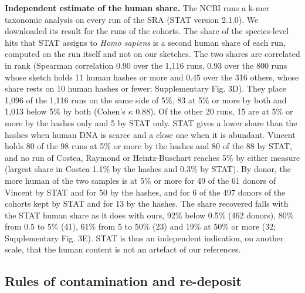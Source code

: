 \documentclass[11pt,a4paper]{article}
\begin{document}
\textbf{Independent estimate of the human share.} The NCBI runs a k-mer taxonomic analysis on every run of the SRA (STAT version 2.1.0\cite{katz2021}). We downloaded its result for the runs of the cohorts. The share of the species-level hits that STAT assigns to \textit{Homo sapiens} is a second human share of each run, computed on the run itself and not on our sketches. The two shares are correlated in rank (Spearman correlation 0.90 over the 1,116 runs, 0.93 over the 800 runs whose sketch holds 11 human hashes or more and 0.45 over the 316 others, whose share rests on 10 human hashes or fewer; Supplementary Fig. 3D). They place 1,096 of the 1,116 runs on the same side of 5\%, 83 at 5\% or more by both and 1,013 below 5\% by both (Cohen's $\kappa$ 0.88). Of the other 20 runs, 15 are at 5\% or more by the hashes only and 5 by STAT only. STAT gives a lower share than the hashes when human DNA is scarce and a close one when it is abundant. Vincent holds 80 of the 98 runs at 5\% or more by the hashes and 80 of the 88 by STAT, and no run of Costea, Raymond or Heintz-Buschart reaches 5\% by either measure (largest share in Costea 1.1\% by the hashes and 0.3\% by STAT). By donor, the more human of the two samples is at 5\% or more for 49 of the 61 donors of Vincent by STAT and for 50 by the hashes, and for 6 of the 497 donors of the cohorts kept by STAT and for 13 by the hashes. The share recovered falls with the STAT human share as it does with ours, 92\% below 0.5\% (462 donors), 80\% from 0.5 to 5\% (41), 61\% from 5 to 50\% (23) and 19\% at 50\% or more (32; Supplementary Fig. 3E). STAT is thus an independent indication, on another scale, that the human content is not an artefact of our references.

\subsection*{Rules of contamination and re-deposit}
\end{document}
